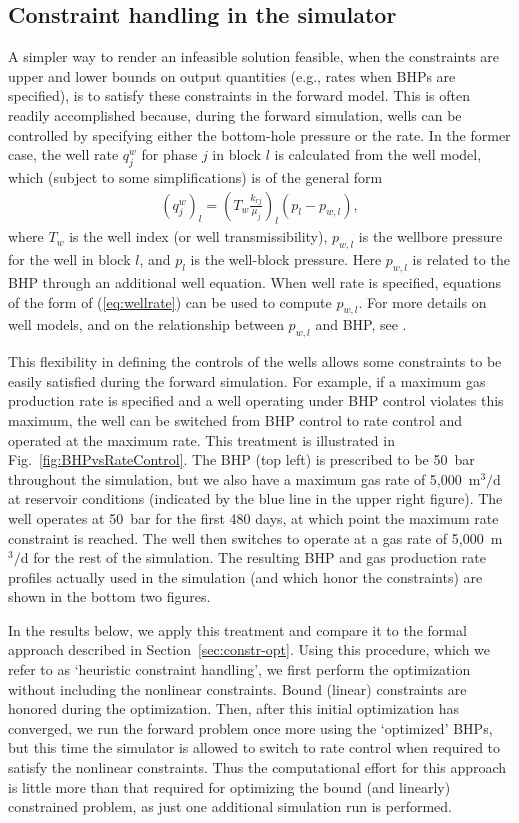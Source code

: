 \subsection{Constraint handling in the simulator}  \label{sec:constr-sim}

A simpler way to render an infeasible solution feasible, when the
constraints are upper and lower bounds on output quantities 
(e.g., rates when BHPs are specified), is to satisfy these constraints 
in the forward model. This is often readily accomplished because, during the forward
simulation, wells can be controlled by specifying either the bottom-hole 
pressure or the rate. In the former case,
the well rate $q_j^w$ for phase $j$ in block $l$ is calculated from the well model, which (subject to some simplifications) is of the general form
%
\begin{align}
\label{eq:wellrate}
  \left( q_j^w \right)_l = \left( T_w\frac{k_{rj}}{\mu_j} \right)_l (p_l - p_{w,l}),
\end{align}
%
where $T_w$ is the well index (or well transmissibility), $p_{w,l}$ is the 
wellbore pressure for the well in block $l$, and $p_l$ is the well-block pressure.
Here $p_{w,l}$ is related to the BHP through an additional well equation. 
When well rate is specified, equations of the form of (\ref{eq:wellrate}) 
can be used to compute $p_{w,l}$. For more details on well models, and on the 
relationship between $p_{w,l}$ and BHP, see \cite{Cao:Thesis}.
%


This flexibility in defining the controls of the wells allows some constraints
to be easily satisfied during the forward simulation. For example, if a maximum
gas production rate is specified and a well operating under BHP control violates
this maximum, the well can be switched from BHP control to rate control and
operated at the maximum rate. This treatment is illustrated in
Fig.~\ref{fig:BHPvsRateControl}. The BHP (top left) is prescribed to be 50~bar
throughout the simulation, but we also have a maximum gas rate of 5,000~m$^3/$d at reservoir conditions (indicated by the blue line in the upper right figure). The well operates at
50~bar for the first 480 days, at which point the maximum rate constraint is
reached. The well then switches to operate at a gas rate of 5,000~m$^3/$d for the
rest of the simulation. The resulting BHP and gas production rate profiles
actually used in the simulation (and which honor the constraints) are shown in
the bottom two figures.

In the results below, we apply this treatment and compare it to the formal approach described in Section~\ref{sec:constr-opt}. Using this procedure, which we refer to as `heuristic constraint handling', we first perform the optimization without including the nonlinear constraints. Bound (linear) constraints are honored during the optimization. Then, after this initial optimization has converged, we run the forward problem once more using the `optimized' BHPs, but this time the simulator is allowed to switch to rate control when required to satisfy the nonlinear constraints. Thus the computational effort for this approach is little more than that required for optimizing the bound (and linearly) constrained problem, as just one additional simulation run is performed.


